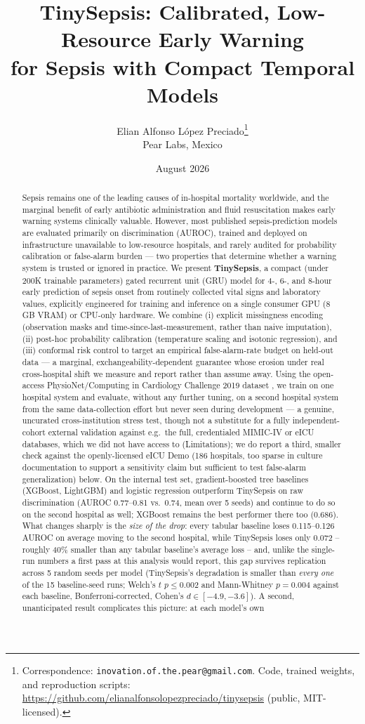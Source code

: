 \documentclass[11pt]{article}
\title{\textbf{TinySepsis: Calibrated, Low-Resource Early Warning\\ for Sepsis with Compact Temporal Models}}
\author{
  Elian Alfonso López Preciado\thanks{Correspondence: \texttt{inovation.of.the.pear@gmail.com}. Code, trained weights, and reproduction scripts: \url{https://github.com/elianalfonsolopezpreciado/tinysepsis} (public, MIT-licensed).} \\
  \small Pear Labs, Mexico
}
\date{August 2026}
\begin{document}
\maketitle

\begin{abstract}
Sepsis remains one of the leading causes of in-hospital mortality worldwide, and the marginal benefit of early antibiotic administration and fluid resuscitation makes early warning systems clinically valuable. However, most published sepsis-prediction models are evaluated primarily on discrimination (AUROC), trained and deployed on infrastructure unavailable to low-resource hospitals, and rarely audited for probability calibration or false-alarm burden --- two properties that determine whether a warning system is trusted or ignored in practice. We present \textbf{TinySepsis}, a compact (under 200K trainable parameters) gated recurrent unit (GRU) model for 4-, 6-, and 8-hour early prediction of sepsis onset from routinely collected vital signs and laboratory values, explicitly engineered for training and inference on a single consumer GPU (8\,GB VRAM) or CPU-only hardware. We combine (i) explicit missingness encoding (observation masks and time-since-last-measurement, rather than naive imputation), (ii) post-hoc probability calibration (temperature scaling and isotonic regression), and (iii) conformal risk control to target an empirical false-alarm-rate budget on held-out data --- a marginal, exchangeability-dependent guarantee whose erosion under real cross-hospital shift we measure and report rather than assume away. Using the open-access PhysioNet/Computing in Cardiology Challenge 2019 dataset \citep{reyna2019early}, we train on one hospital system and evaluate, without any further tuning, on a second hospital system from the same data-collection effort but never seen during development --- a genuine, uncurated cross-institution stress test, though not a substitute for a fully independent-cohort external validation against e.g.\ the full, credentialed MIMIC-IV or eICU databases, which we did not have access to (Limitations); we do report a third, smaller check against the openly-licensed eICU Demo (186 hospitals, too sparse in culture documentation to support a sensitivity claim but sufficient to test false-alarm generalization) below. On the internal test set, gradient-boosted tree baselines (XGBoost, LightGBM) and logistic regression outperform TinySepsis on raw discrimination (AUROC 0.77--0.81 vs.\ 0.74, mean over 5 seeds) and continue to do so on the second hospital as well; XGBoost remains the best performer there too (0.686). What changes sharply is the \emph{size of the drop}: every tabular baseline loses 0.115--0.126 AUROC on average moving to the second hospital, while TinySepsis loses only 0.072 -- roughly 40\% smaller than any tabular baseline's average loss -- and, unlike the single-run numbers a first pass at this analysis would report, this gap survives replication across 5 random seeds per model (TinySepsis's degradation is smaller than \emph{every one} of the 15 baseline-seed runs; Welch's $t$ $p\le 0.002$ and Mann-Whitney $p=0.004$ against each baseline, Bonferroni-corrected, Cohen's $d\in[-4.9,-3.6]$). A second, unanticipated result complicates this picture: at each model's own 
\end{abstract}
\end{document}
